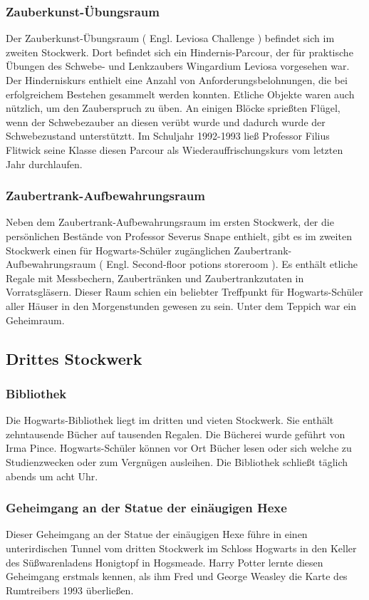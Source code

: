 \documentclass[a4paper, 10pt]{article}
\begin{document}
\subsubsection*{\large Zauberkunst-Übungsraum}
Der Zauberkunst-Übungsraum (  Engl.  Leviosa Challenge ) befindet sich im zweiten Stockwerk. Dort befindet sich ein Hindernis-Parcour, der für praktische Übungen des Schwebe- und Lenkzaubers Wingardium Leviosa vorgesehen war. Der Hinderniskurs enthielt eine Anzahl von Anforderungsbelohnungen, die bei erfolgreichem Bestehen gesammelt werden konnten. Etliche Objekte waren auch nützlich, um den Zauberspruch zu üben. An einigen Blöcke sprießten Flügel, wenn der Schwebezauber an diesen verübt wurde und dadurch wurde der Schwebezustand unterstütztt. Im Schuljahr 1992-1993 ließ Professor Filius Flitwick seine Klasse diesen Parcour als Wiederauffrischungskurs vom letzten Jahr durchlaufen.
\subsubsection*{\large Zaubertrank-Aufbewahrungsraum}
Neben dem Zaubertrank-Aufbewahrungsraum im ersten Stockwerk, der die persönlichen Bestände von Professor Severus Snape enthielt, gibt es im zweiten Stockwerk einen für Hogwarts-Schüler zugänglichen Zaubertrank-Aufbewahrungsraum (  Engl.  Second-floor potions storeroom ). Es enthält etliche Regale mit Messbechern, Zaubertränken und Zaubertrankzutaten in Vorratsgläsern. Dieser Raum schien ein beliebter Treffpunkt für Hogwarts-Schüler aller Häuser in den Morgenstunden gewesen zu sein. Unter dem Teppich war ein Geheimraum.


\subsection*{\Large Drittes Stockwerk}

\subsubsection*{\large Bibliothek}
Die Hogwarts-Bibliothek liegt im dritten und vieten Stockwerk. Sie enthält zehntausende Bücher auf tausenden Regalen. Die Bücherei wurde geführt von Irma Pince. Hogwarts-Schüler können vor Ort Bücher lesen oder sich welche zu Studienzwecken oder zum Vergnügen ausleihen. Die Bibliothek schließt täglich abends um acht Uhr.
\subsubsection*{\large Geheimgang an der Statue der einäugigen Hexe}
Dieser Geheimgang an der Statue der einäugigen Hexe führe in einen unterirdischen Tunnel vom dritten Stockwerk im Schloss Hogwarts in den Keller des Süßwarenladens Honigtopf in Hogsmeade. Harry Potter lernte diesen Geheimgang erstmals kennen, als ihm Fred und George Weasley die Karte des Rumtreibers 1993 überließen.
\end{document}
